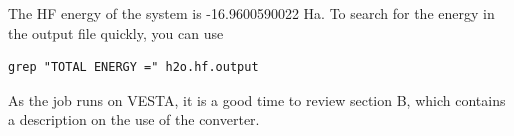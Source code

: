 The HF energy of the
system is -16.9600590022 Ha. To search for the energy in the output file quickly, you can
use 
\begin{shaded}
\begin{verbatim}
grep "TOTAL ENERGY =" h2o.hf.output
\end{verbatim}
\end{shaded}
As the job runs on VESTA, it is a good time to review section B, which contains a description on the use of the converter.


